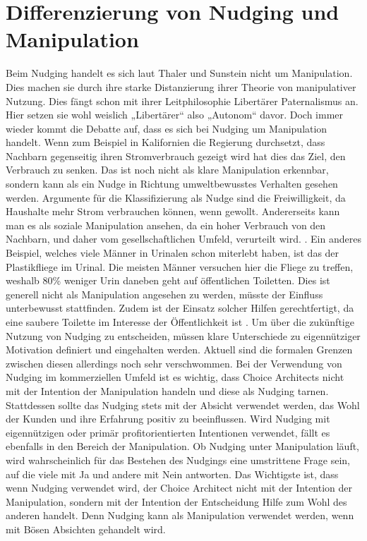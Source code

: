 \section{Differenzierung von Nudging und Manipulation}
Beim Nudging handelt es sich laut Thaler und Sunstein nicht um Manipulation. Dies machen sie durch ihre starke Distanzierung ihrer Theorie von manipulativer Nutzung. Dies fängt schon mit ihrer Leitphilosophie Libertärer Paternalismus an. Hier setzen sie wohl weislich „Libertärer“ also „Autonom“ davor. Doch immer wieder kommt die Debatte auf, dass es sich bei Nudging um Manipulation handelt. Wenn zum Beispiel in Kalifornien die Regierung durchsetzt, dass Nachbarn gegenseitig ihren Stromverbrauch gezeigt wird hat dies das Ziel, den Verbrauch zu senken. Das ist noch nicht als klare Manipulation erkennbar, sondern kann als ein Nudge in Richtung umweltbewusstes Verhalten gesehen werden. Argumente für die Klassifizierung als Nudge sind die Freiwilligkeit, da Haushalte mehr Strom verbrauchen können, wenn gewollt. Andererseits kann man es als soziale Manipulation ansehen, da ein hoher Verbrauch von den Nachbarn, und daher vom gesellschaftlichen Umfeld, verurteilt wird. \parencite{BerufsverbandDeutscherPsychologinnenundPsychologen.2015}. 
Ein anderes Beispiel, welches viele Männer in Urinalen schon miterlebt haben, ist das der Plastikfliege im Urinal. Die meisten Männer versuchen hier die Fliege zu treffen, weshalb 80\% weniger Urin daneben geht auf öffentlichen Toiletten. Dies ist generell nicht als Manipulation angesehen zu werden, müsste der Einfluss unterbewusst stattfinden. Zudem ist der Einsatz solcher Hilfen gerechtfertigt, da eine saubere Toilette im Interesse der Öffentlichkeit ist \parencite{Brautzsch.2020}.
Um über die zukünftige Nutzung von Nudging zu entscheiden, müssen klare Unterschiede zu eigennütziger Motivation definiert und eingehalten werden. Aktuell sind die formalen Grenzen zwischen diesen allerdings noch sehr verschwommen.
Bei der Verwendung von Nudging im kommerziellen Umfeld ist es wichtig, dass Choice Architects nicht mit der Intention der Manipulation handeln und diese als Nudging tarnen. Stattdessen sollte das Nudging stets mit der Absicht verwendet werden, das Wohl der Kunden und ihre Erfahrung positiv zu beeinflussen. Wird Nudging mit eigennützigen oder primär profitorientierten Intentionen verwendet, fällt es ebenfalls in den Bereich der Manipulation.
Ob Nudging unter Manipulation läuft, wird wahrscheinlich für das Bestehen des Nudgings eine umstrittene Frage sein, auf die viele mit Ja und andere mit Nein antworten. 
Das Wichtigste ist, dass wenn Nudging verwendet wird, der Choice Architect nicht mit der Intention der Manipulation, sondern mit der Intention der Entscheidung Hilfe zum Wohl des anderen handelt. Denn Nudging kann als Manipulation verwendet werden, wenn mit Bösen Absichten gehandelt wird.
